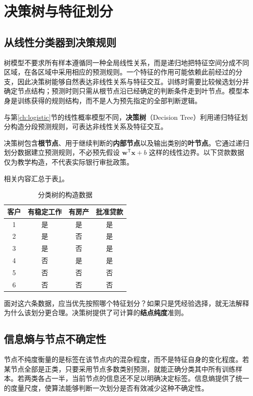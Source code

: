 \section{决策树与特征划分}\label{ch:decision-tree}

\subsection{从线性分类器到决策规则}

树模型不要求所有样本遵循同一种全局线性关系，而是递归地把特征空间分成不同区域，在各区域中采用相应的预测规则。一个特征的作用可能依赖此前经过的分支，因此决策树能够自然表达非线性关系与特征交互。训练时需要比较候选划分并确定节点结构；预测时则只需从根节点沿已经确定的判断条件走到叶节点。模型本身是训练获得的规则结构，而不是人为预先指定的全部判断逻辑。

与第\ref{ch:logistic}节的线性概率模型不同，\textbf{决策树}（Decision Tree）利用递归特征划分构造分段预测规则，可表达非线性关系及特征交互。

决策树包含\textbf{根节点}、用于继续判断的\textbf{内部节点}以及输出类别的\textbf{叶节点}。它通过递归划分数据建立预测规则，不必预先假设 $\boldsymbol w^{\mathsf T}\boldsymbol x+b$ 这样的线性边界。以下贷款数据仅为教学构造，不代表实际银行审批政策。

相关内容汇总于表\ref{tab:tree-samples}。
\begin{table}[htbp]\centering
\caption{分类树的构造数据}\label{tab:tree-samples}
\begin{tabular}{cccc}\toprule
客户&有稳定工作&有房产&批准贷款\\\midrule
1&是&是&是\\
2&是&否&是\\
3&是&否&是\\
4&否&是&是\\
5&否&否&否\\
6&否&否&否\\\bottomrule
\end{tabular}
\end{table}
面对这六条数据，应当优先按照哪个特征划分？如果只是凭经验选择，就无法解释为什么该划分更合理。决策树提供了可计算的\textbf{结点纯度}准则\cite[第4章]{zhou2016}\cite[第5章]{lihang2019}。

\subsection{信息熵与节点不确定性}

节点不纯度衡量的是标签在该节点内的混杂程度，而不是特征自身的变化程度。若某节点全部是正类，只要采用节点多数类别预测，就能正确分类其中所有训练样本。若两类各占一半，当前节点的信息还不足以明确决定标签。信息熵提供了统一的度量尺度，使算法能够判断一次划分是否有效减少这种不确定性。

